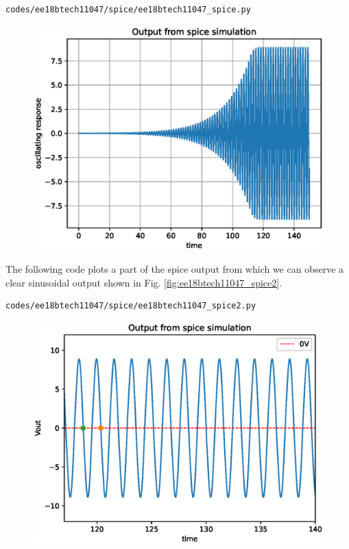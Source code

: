 \begin{enumerate}[label=\arabic*.,ref=\theenumi]
\begin{lstlisting}
codes/ee18btech11047/spice/ee18btech11047_spice.py
\end{lstlisting}
\renewcommand{\thefigure}{\theenumi.\arabic{figure}}
%
\begin{figure}[!ht]
\centering
\includegraphics[width=\columnwidth]{./figs/ee18btech11047/ee18btech11047_spice.eps}
\caption{}
\label{fig:ee18btech11047_spice}
\end{figure}
%
The following code plots a part of the spice output from which we can observe a clear sinusoidal output shown in Fig. \ref{fig:ee18btech11047_spice2}.
\begin{lstlisting}
codes/ee18btech11047/spice/ee18btech11047_spice2.py
\end{lstlisting}
\begin{figure}[!ht]
\centering
\includegraphics[width=\columnwidth]{./figs/ee18btech11047/ee18btech11047_spice2.eps}

\end{figure}
\end{enumerate}
